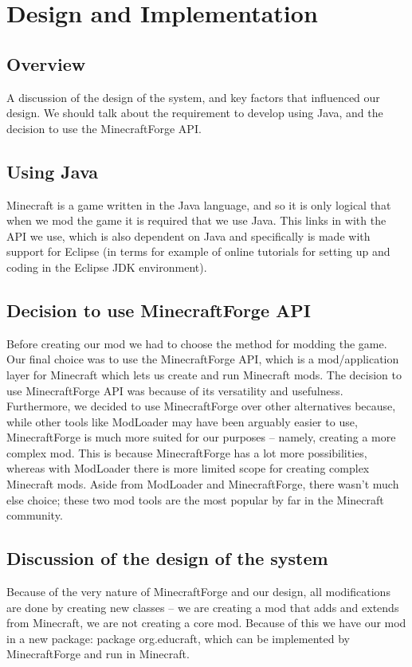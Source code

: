 \chapter{Design and Implementation}

\section{Overview}
A discussion of the design of the system, and key factors that influenced our design. We should talk about the requirement to develop using Java, and the decision to use the MinecraftForge API.

\section{Using Java}
Minecraft is a game written in the Java language, and so it is only logical that when we mod the game it is required that we use Java. This links in with the API we use, which is also dependent on Java and specifically is made with support for Eclipse (in terms for example of online tutorials for setting up and coding in the Eclipse JDK environment). 

\section{Decision to use MinecraftForge API}
Before creating our mod we had to choose the method for modding the game. Our final choice was to use the MinecraftForge API, which is a mod/application layer for Minecraft which lets us create and run Minecraft mods. The decision to use MinecraftForge API was because of its versatility and usefulness. Furthermore, we decided to use MinecraftForge over other alternatives because, while other tools like ModLoader may have been arguably easier to use, MinecraftForge is much more suited for our purposes – namely, creating a more complex mod. This is because MinecraftForge has a lot more possibilities, whereas with ModLoader there is more limited scope for creating complex Minecraft mods. Aside from ModLoader and MinecraftForge, there wasn’t much else choice; these two mod tools are the most popular by far in the Minecraft community.  

\section{Discussion of the design of the system}
Because of the very nature of MinecraftForge and our design, all modifications are done by creating new classes – we are creating a mod that adds and extends from Minecraft, we are not creating a core mod. Because of this we have our mod in a new package: package org.educraft, which can be implemented by MinecraftForge and run in Minecraft. 

